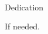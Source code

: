 
\clearpage{}
{}

\renewcommand{\baselinestretch}{2}
\small\normalsize
\hbox{\ }
 
\vspace{-.65in}

\begin{center}
\large{Dedication}
\end{center}
\vspace{1ex}

If needed.
